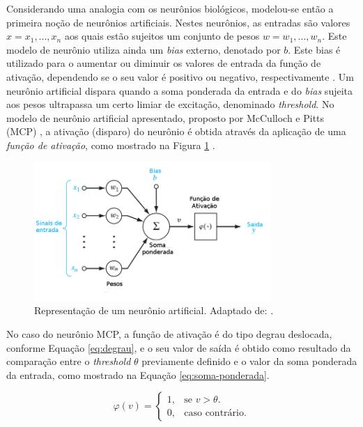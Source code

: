 Considerando uma analogia com os neurônios biológicos, modelou-se então a primeira noção de neurônios artificiais. Nestes neurônios, as entradas são valores $x = x_1, ..., x_n$ aos quais estão sujeitos um conjunto de pesos $w = w_1, ..., w_n$. Este modelo de neurônio utiliza ainda um \emph{bias} externo, denotado por $b$. Este bias é utilizado para o aumentar ou diminuir os valores de entrada da função de ativação, dependendo se o seu valor é positivo ou negativo, respectivamente \cite{haykin}. Um neurônio artificial dispara quando a soma ponderada da entrada e do \emph{bias} sujeita aos pesos ultrapassa um certo limiar de excitação, denominado \emph{threshold}. No modelo de neurônio artificial apresentado, proposto por McCulloch e Pitts (MCP) \cite{mcculloch}, a ativação (disparo) do neurônio é obtida através da aplicação de uma \emph{função de ativação}, como mostrado na Figura \ref{fig:neuronio-artificial} \cite{braga}.

\begin{figure}[H]
\centering
\caption{Representação de um neurônio artificial. Adaptado de: \cite{haykin}.}
\label{fig:neuronio-artificial}
\includegraphics[width=0.8\textwidth]{imgs/neuronio-artificial}
\end{figure}

No caso do neurônio MCP, a função de ativação é do tipo degrau deslocada, conforme Equação \ref{eq:degrau}, e o seu valor de saída é obtido como resultado da comparação entre o \emph{threshold} $\theta$ previamente definido e o valor da soma ponderada da entrada, como mostrado na Equação \ref{eq:soma-ponderada}.

\begin{equation}
\label{eq:degrau}
\varphi(v) = \left\{
\begin{array}{lr}
  1, & \text{se } v > \theta.\\
  0, & \text{caso contrário}.
\end{array}
\right.
\end{equation}

